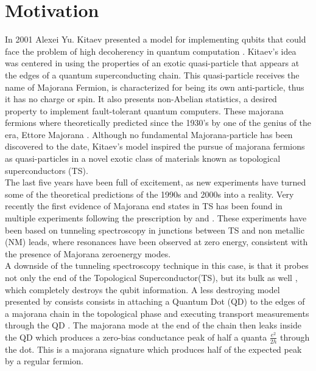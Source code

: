 \chapter{Motivation}

In 2001 Alexei Yu. Kitaev presented a model for implementing qubits
that could face the problem of high decoherency in quantum computation \citep{kitaev_unpaired_2001}. Kitaev's idea was centered in using the properties of an exotic quasi-particle that appears at the edges of a quantum superconducting chain. This quasi-particle receives the name of Majorana Fermion, is characterized for being its own anti-particle, thus it has no charge or spin. It also presents non-Abelian statistics, a desired property to implement fault-tolerant quantum computers\citep{kitaev_fault-tolerant_2003}. These majorana fermions where theoretically predicted since the 1930's by one of the genius of the era, Ettore Majorana \citep{wilczek_majorana_2009}.
Although no fundamental Majorana-particle has been discovered to the
date, Kitaev's model inspired the pursue of majorana fermions as
quasi-particles in a novel exotic class of materials known as topological
superconductors (TS)\citep{fu_superconducting_2008,sato_non-abelian_2009,alicea_new_2012}.
\\

The last five years have been full of excitement, as new experiments
have turned some of the theoretical predictions of the 1990s and 2000s
into a reality. Very recently the first evidence of Majorana end states
in TS has been found in multiple experiments \citep{mourik_signatures_2012,das_zero-bias_2012,deng_anomalous_2012}
following the prescription by \citet{oreg_helical_2010} and \citet{lutchyn_majorana_2010}.
These experiments have been based on tunneling spectroscopy in junctions
between TS and non metallic (NM) leads, where resonances have been
observed at zero energy, consistent with the presence of Majorana
zero\textendash energy modes.\\

A downside of the tunneling spectroscopy technique in this case, is
that it probes not only the end of the Topological Superconductor(TS), but its bulk as well ,
which completely destroys the qubit information. A less destroying
model presented by \citet{liu_detecting_2011} consists consists in attaching a Quantum Dot (QD) to the edges of a majorana chain in the topological phase and executing transport measurements through the QD \cite{liu_detecting_2011} . The majorana mode at the end of the chain then leaks inside the QD \cite{vernek_subtle_2014} which produces a zero-bias conductance peak of half a quanta $\frac{e^{2}}{2h}$ through the dot. This is a majorana signature which produces half of the expected peak by a regular fermion.

